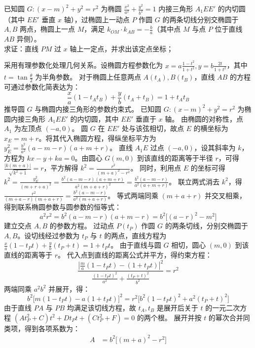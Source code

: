 \begin{exercise}
已知圆 \(G: (x - m)^2 + y^2 = r^2\) 为椭圆 \(\frac{x^2}{a^2} + \frac{y^2}{b^2} = 1\) 内接三角形 \(A_1EE'\) 的内切圆（其中 \(EE'\) 垂直 \(x\) 轴），过椭圆上一动点 \(P\) 作圆 \(G\) 的两条切线分别交椭圆于 \(A,B\) 两点，椭圆上一点 \(M\)，满足 \(k_{OM} \cdot k_{AB} = -\frac{b}{a}\)（其中点 \(M\) 与点 \(P\) 位于直线 \(AB\) 异侧）。\\
求证：直线 \(PM\) 过 \(x\) 轴上一定点，并求出该定点坐标；
\end{exercise}
\begin{solution}
采用有理参数化处理几何关系。设椭圆方程参数化为 $x = a \frac{1-t^2}{1+t^2}, y = b \frac{2t}{1+t^2}$，其中 $t = \tan\frac{\theta}{2}$ 为半角参数。
对于椭圆上任意两点 $A(t_A), B(t_B)$，直线 $AB$ 的方程可通过参数化简表达为：
\[ \frac{x}{a}(1-t_A t_B) + \frac{y}{b}(t_A+t_B) = 1+t_A t_B \]
推导圆 $G$ 与椭圆内接三角形的参数约束式。
已知圆 $G: (x-m)^2 + y^2 = r^2$ 为椭圆内接三角形 $A_1EE'$ 的内切圆，其中 $EE'$ 垂直于 $x$ 轴。
由椭圆的对称性，点 $A_1$ 为左顶点 $(-a,0)$。
圆 $G$ 在 $EE'$ 处与该弦相切，故点 $E$ 的横坐标为 $x_E = m+r$。将其代入椭圆方程，得纵坐标平方为 $y_E^2 = \frac{b^2}{a^2}(a-m-r)(a+m+r)$。
直线 $A_1E$ 过点 $(-a,0)$，设其斜率为 $k$，方程为 $kx - y + ka = 0$。由圆心 $G(m,0)$ 到该直线的距离等于半径 $r$，可得 $\frac{|k(m+a)|}{\sqrt{k^2+1}} = r$，平方解得 $k^2 = \frac{r^2}{(m+a)^2 - r^2}$。
同时，利用点 $E$ 的坐标可得 $k^2 = \frac{y_E^2}{(m+r+a)^2} = \frac{b^2(a-m-r)(a+m+r)}{a^2(m+a+r)^2} = \frac{b^2(a-m-r)}{a^2(a+m+r)}$。
联立两式消去 $k^2$，得 $\frac{r^2}{(m+a-r)(m+a+r)} = \frac{b^2(a-m-r)}{a^2(m+a+r)}$。
等式两端同乘 $(m+a+r)$ 并交叉相乘，得到联系椭圆参数与圆参数的恒等式：
\[ a^2 r^2 = b^2(a-m-r)(a+m-r) = b^2 \big[ (a-r)^2 - m^2 \big] \]
建立交点 $A, B$ 的参数方程。
过动点 $P(t_P)$ 作圆 $G$ 的两条切线，分别交椭圆于 $A, B$。设切线经过参数为 $t_P$ 与 $t$ 的两点，直线方程为 $\frac{x}{a}(1-t_P t) + \frac{y}{b}(t_P+t) = 1+t_P t$。
由于直线与圆 $G$ 相切，圆心 $(m,0)$ 到该直线的距离等于 $r$。
代入点到直线的距离公式并平方，得约束方程：
\[ \frac{\left| \frac{m}{a}(1-t_P t) - (1+t_P t) \right|^2}{ \frac{(1-t_P t)^2}{a^2} + \frac{(t_P+t)^2}{b^2} } = r^2 \]
两端同乘 $a^2 b^2$ 并展开，得：
\[ b^2 \big[ m(1-t_P t) - a(1+t_P t) \big]^2 = r^2 \big[ b^2(1-t_P t)^2 + a^2(t_P+t)^2 \big] \]
由于直线 $PA$ 与 $PB$ 均满足该切线方程，故 $t_A, t_B$ 是展开后关于 $t$ 的一元二次方程 $(A t_P^2 + C) t^2 + D t_P t + (C t_P^2 + F) = 0$ 的两个根。
展开并按 $t$ 的幂次合并同类项，得到各项系数为：
\begin{align*}
A &= b^2 \big[ (m+a)^2 - r^2 \big] \\

\end{align*}
\end{solution}
